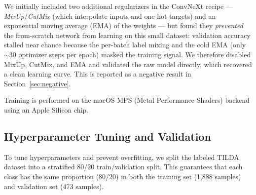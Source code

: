 \documentclass{name}
\begin{document}
We initially included two additional regularizers in the ConvNeXt recipe --- \emph{MixUp}/\emph{CutMix} (which interpolate inputs and one-hot targets) and an exponential moving average (EMA) of the weights --- but found they \emph{prevented} the from-scratch network from learning on this small dataset: validation accuracy stalled near chance because the per-batch label mixing and the cold EMA (only $\sim$30 optimizer steps per epoch) masked the training signal. We therefore disabled MixUp, CutMix, and EMA and validated the raw model directly, which recovered a clean learning curve. This is reported as a negative result in Section~\ref{sec:negative}.

Training is performed on the macOS MPS (Metal Performance Shaders) backend using an Apple Silicon chip.
\begin{table}[H]
\centering
\caption{Model Architecture Details and Parameter Counts}
\label{tab:models}
\end{table}

\subsection{Hyperparameter Tuning and Validation}
To tune hyperparameters and prevent overfitting, we split the labeled TILDA dataset into a stratified 80/20 train/validation split. This guarantees that each class has the same proportion (80/20) in both the training set (1,888 samples) and validation set (473 samples).
\end{document}
